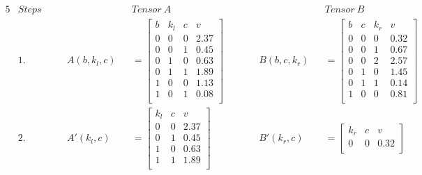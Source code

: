 \begin{alignat*}{5}
    &Steps \quad && &&Tensor\ A && &&Tensor\ B \\
    &1. &&A(b, k_l, c) &&= \begin{bmatrix}
                                 b & k_l & c & v    \\
                                 0 & 0   & 0 & 2.37 \\
                                 0 & 0   & 1 & 0.45 \\
                                 0 & 1   & 0 & 0.63 \\
                                 0 & 1   & 1 & 1.89 \\
                                 1 & 0   & 0 & 1.13 \\
                                 1 & 0   & 1 & 0.08 \\
                             \end{bmatrix} \qquad 
    &&B(b, c, k_r) &&= \begin{bmatrix}
                        b & c & k_r & v    \\
                        0 & 0 & 0   & 0.32 \\
                        0 & 0 & 1   & 0.67 \\
                        0 & 0 & 2   & 2.57 \\
                        0 & 1 & 0   & 1.45 \\
                        0 & 1 & 1   & 0.14 \\
                        1 & 0 & 0   & 0.81 \\
                    \end{bmatrix}
    \\
    &2. &&A'(k_l, c) &&= \begin{bmatrix}
                                k_l & c & v    \\
                                0   & 0 & 2.37 \\
                                0   & 1 & 0.45 \\
                                1   & 0 & 0.63 \\
                                1   & 1 & 1.89 \\
                            \end{bmatrix}
    &&B'(k_r, c) &&= \begin{bmatrix}
                        k_r & c & v    \\
                        0   & 0 & 0.32 \\

\end{bmatrix}
\end{alignat*}
